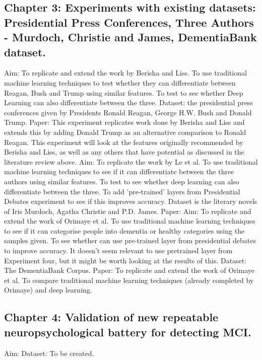\documentclass{article}
\begin{document}
\subsection{Chapter 3: Experiments with existing datasets: Presidential Press Conferences, Three Authors - Murdoch, Christie and James, DementiaBank dataset.}
Aim: To replicate and extend the work by Berisha and Liss. To use traditional machine learning techniques to test whether they can differentiate between Reagan, Bush and Trump using similar features. To test to see whether Deep Learning can also differentiate between the three. \newline
Dataset: the presidential press conferences given by Presidents Ronald Reagan, George H.W. Bush and Donald Trump. \newline
Paper: This experiment replicates work done by Berisha and Liss and extends this by adding Donald Trump as an alternative comparison to Ronald Reagan. This experiment will look at the features originally recommended by Berisha and Liss, as well as any others that have potential as discussed in the literature review above. \newline
Aim: To replicate the work by Le et al. To use traditional machine learning techniques to see if it can differentiate between the three authors using similar features. To test to see whether deep learning can also differentiate between the three. To add 'pre-trained' layers from Presidential Debates experiment to see if this improves accuracy. \newline
Dataset is the literary novels of Iris Murdoch, Agatha Christie and P.D. James. \newline
Paper:
Aim: To replicate and extend the work of Orimaye et al. To use traditional machine learning techniques to see if it can categorise people into dementia or healthy categories using the samples given. To see whether can use pre-trained layer from presidential debates to improve accuracy. It doesn't seem relevant to use pretrained layer from Experiment four, but it might be worth looking at the results of this. \newline
Dataset: The DementiaBank Corpus. \newline
Paper: To replicate and extend the work of Orimaye et al. To compare traditional machine learning techniques (already completed by Orimaye) and deep learning. \newline
\subsection{Chapter 4: Validation of new repeatable neuropsychological battery for detecting MCI.}
Aim: \newline
Dataset: To be created.
\end{document}
